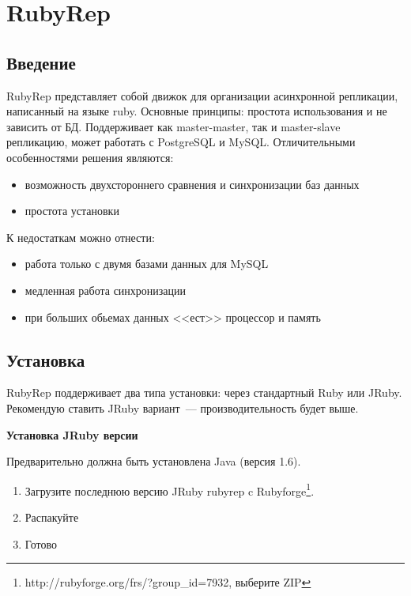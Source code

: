 \section{RubyRep}
\subsection{Введение}
RubyRep представляет собой движок для организации асинхронной репликации, написанный на языке ruby. 
Основные принципы: простота использования и не зависить от БД. 
Поддерживает как master-master, так и master-slave репликацию, может работать с PostgreSQL и MySQL.
Отличительными особенностями решения являются:
\begin{itemize}
\item возможность двухстороннего сравнения и синхронизации баз данных
\item простота установки
\end{itemize}
К недостаткам можно отнести:
\begin{itemize}
\item работа только с двумя базами данных для MySQL
\item медленная работа синхронизации 
\item при больших обьемах данных <<ест>> процессор и память
\end{itemize}


\subsection{Установка}
RubyRep поддерживает два типа установки: через стандартный Ruby или JRuby. 
Рекомендую ставить JRuby вариант~--- производительность будет выше.

\textbf{Установка JRuby версии}

Предварительно должна быть установлена Java (версия 1.6).
\begin{enumerate}
 \item Загрузите последнюю версию JRuby rubyrep c Rubyforge\footnote{http://rubyforge.org/frs/?group\_id=7932, выберите ZIP}.
 \item Распакуйте
 \item Готово
\end{enumerate}

